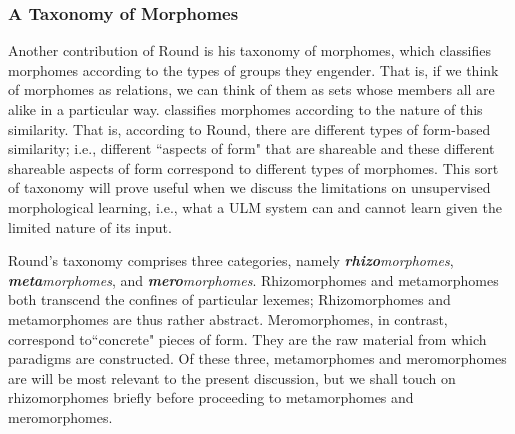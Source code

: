 


\subsubsection{A Taxonomy of Morphomes}
Another contribution of Round is his taxonomy of morphomes, which 
classifies morphomes according to the types of groups they engender. 
That is, if we think of morphomes as relations, we can think of them as 
sets whose members all are alike in a particular way. \cite{round:2015, round:md:2016} 
classifies morphomes according to the nature of this similarity. That is, 
according to Round, there are different types of form-based similarity; i.e., different ``aspects of form" that are 
shareable \citep[][p.230]{round:md:2016} and these different shareable aspects of form correspond to different types of morphomes. 
This sort of taxonomy will prove useful when we discuss the 
limitations on unsupervised morphological learning, i.e., what a \ac{ULM} 
system can and cannot learn given the limited nature of its input.

Round's taxonomy comprises three categories, namely 
\textit{\textbf{rhizo}morphomes}, \textit{\textbf{meta}morphomes}, 
and \textit{\textbf{mero}morphomes}. 
Rhizomorphomes and metamorphomes both transcend the confines of 
particular lexemes; Rhizomorphomes and metamorphomes are thus 
rather abstract. Meromorphomes, in contrast, correspond to``concrete" 
pieces of form. They are the raw material from which paradigms are constructed. 
Of these three, metamorphomes and meromorphomes are will be most 
relevant to the present discussion, but we shall touch on rhizomorphomes briefly 
before proceeding to metamorphomes and meromorphomes.

